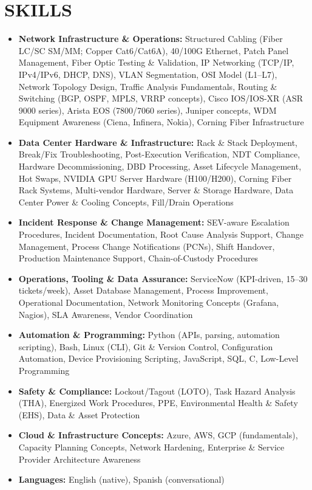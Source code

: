 \documentclass[letterpaper,11pt]{article}
\begin{document}
\section{\color{airforceblue}SKILLS}
\begin{itemize}[leftmargin=0in, label={}]

  \item \textbf{Network Infrastructure \& Operations:}
  Structured Cabling (Fiber LC/SC SM/MM; Copper Cat6/Cat6A), 40/100G Ethernet, Patch Panel Management, Fiber Optic Testing \& Validation, IP Networking (TCP/IP, IPv4/IPv6, DHCP, DNS), VLAN Segmentation, OSI Model (L1--L7), Network Topology Design, Traffic Analysis Fundamentals, Routing \& Switching (BGP, OSPF, MPLS, VRRP concepts), Cisco IOS/IOS-XR (ASR 9000 series), Arista EOS (7800/7060 series), Juniper concepts, WDM Equipment Awareness (Ciena, Infinera, Nokia), Corning Fiber Infrastructure

  \item \textbf{Data Center Hardware \& Infrastructure:}
  Rack \& Stack Deployment, Break/Fix Troubleshooting, Post-Execution Verification, NDT Compliance, Hardware Decommissioning, DBD Processing, Asset Lifecycle Management, Hot Swaps, NVIDIA GPU Server Hardware (H100/H200), Corning Fiber Rack Systems, Multi-vendor Hardware, Server \& Storage Hardware, Data Center Power \& Cooling Concepts, Fill/Drain Operations

  \item \textbf{Incident Response \& Change Management:}
  SEV-aware Escalation Procedures, Incident Documentation, Root Cause Analysis Support, Change Management, Process Change Notifications (PCNs), Shift Handover, Production Maintenance Support, Chain-of-Custody Procedures

  \item \textbf{Operations, Tooling \& Data Assurance:}
  ServiceNow (KPI-driven, 15--30 tickets/week), Asset Database Management, Process Improvement, Operational Documentation, Network Monitoring Concepts (Grafana, Nagios), SLA Awareness, Vendor Coordination

  \item \textbf{Automation \& Programming:}
  Python (APIs, parsing, automation scripting), Bash, Linux (CLI), Git \& Version Control, Configuration Automation, Device Provisioning Scripting, JavaScript, SQL, C, Low-Level Programming

  \item \textbf{Safety \& Compliance:}
  Lockout/Tagout (LOTO), Task Hazard Analysis (THA), Energized Work Procedures, PPE, Environmental Health \& Safety (EHS), Data \& Asset Protection

  \item \textbf{Cloud \& Infrastructure Concepts:}
  Azure, AWS, GCP (fundamentals), Capacity Planning Concepts, Network Hardening, Enterprise \& Service Provider Architecture Awareness

  \item \textbf{Languages:}
  English (native), Spanish (conversational)

\end{itemize}
\end{document}
